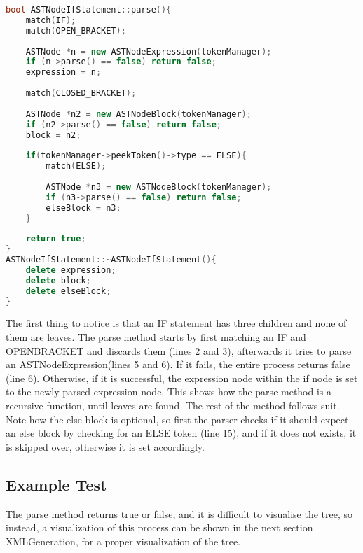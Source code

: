 \begin{lstlisting}[language=C++]
bool ASTNodeIfStatement::parse(){
	match(IF);
	match(OPEN_BRACKET);
	
	ASTNode *n = new ASTNodeExpression(tokenManager);
	if (n->parse() == false) return false;
	expression = n;
	
	match(CLOSED_BRACKET);
	
	ASTNode *n2 = new ASTNodeBlock(tokenManager);
	if (n2->parse() == false) return false;
	block = n2;
	
	if(tokenManager->peekToken()->type == ELSE){
		match(ELSE);
		
		ASTNode *n3 = new ASTNodeBlock(tokenManager);
		if (n3->parse() == false) return false;
		elseBlock = n3;
	}
	
	return true;
}
ASTNodeIfStatement::~ASTNodeIfStatement(){
	delete expression;
	delete block;
	delete elseBlock;
}
\end{lstlisting}

The first thing to notice is that an IF statement has three children and none of them are leaves. The parse method starts by first matching an IF and OPEN\un BRACKET and discards them (lines 2 and 3), afterwards it tries to parse an ASTNodeExpression(lines 5 and 6). If it fails, the entire process returns false (line 6). Otherwise, if it is successful, the expression node within the if node is set to the newly parsed expression node. This shows how the parse method is a recursive function, until leaves are found. The rest of the method follows suit. Note how the else block is optional, so first the parser checks if it should expect an else block by checking for an ELSE token (line 15), and if it does not exists, it is skipped over, otherwise it is set accordingly.


\subsection{Example Test}
The parse method returns true or false, and it is difficult to visualise the tree, so instead, a visualization of this process can be shown in the next section XMLGeneration, for a proper visualization of the tree.